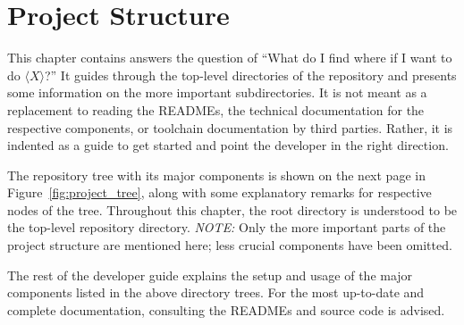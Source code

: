 %
%
\chapter{Project Structure} %
\label{ch:devguide:project_structure}

This chapter contains answers the question of ``What do I find where if I want
to  do $\langle  X  \rangle$?'' It guides  through  the top-level  directories
of  the  repository  and  presents  some information  on  the  more  important
subdirectories. It  is not  meant as  a  replacement to  reading the  READMEs,
the  technical  documentation  for  the respective  components,  or  toolchain
documentation  by third  parties. Rather, it  is indented  as a  guide to  get
started and  point the developer in  the right direction.

The  repository tree  with its  major  components is  shown on  the next  page
in  Figure~\ref{fig:project_tree},  along   with  some  explanatory  remarks
for  respective  nodes  of  the  tree.   Throughout  this  chapter,  the  root
directory \code{/}  is understood  to be  the top-level  repository directory.
\emph{NOTE:} Only  the  more important  parts  of  the project  structure  are
mentioned here; less crucial components have been omitted.

The rest  of the  developer guide explains  the setup and  usage of  the major
components listed  in the above  directory trees. For the most  up-to-date and
complete documentation, consulting the READMEs and source code is advised.

